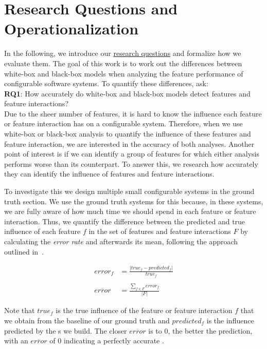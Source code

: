 \section{Research Questions and Operationalization}\label{ch:operationalization}

In the following, we introduce our \hyperref[researchQuestions]{research questions} and formalize how we evaluate them. 
The goal of this work is to work out the differences between white-box and black-box models when analyzing the feature performance of configurable
software systems. 
To quantify these differences, ask:\\

\noindent \textbf{RQ1}: How accurately do white-box and black-box models detect features and feature interactions? \\

Due to the sheer number of features, it is hard to know the influence each feature or feature interaction has on a configurable system. 
Therefore, when we use white-box or black-box analysis to quantify the influence of these features and feature interaction, 
we are interested in the accuracy of both analyses. 
Another point of interest is if we can identify a group of features for which either analysis performs worse than its counterpart.
To answer this, we research how accurately they can identify the influence of features and feature interactions.

To investigate this we design multiple small configurable systems in the ground truth section. 
We use the ground truth systems for this because, in these systems, 
we are fully aware of how much time we should spend in each feature or feature interaction. 
Thus, we quantify the difference between the predicted and true influence of each feature $f$ in the set of features and feature interactions $F$
by calculating the \emph{error rate} and afterwards its mean, following the approach outlined in~\cite{mape}. %


\begin{align}
    error_f &= \frac{\lvert true_f - predicted_f \rvert}{true_f} \label{equ:APE_RQ1} \\ \nonumber \\
    \overline{error}  &= \frac{\sum_{f \in F} error_f}{\lvert F \rvert} \label{equ:MAPE_RQ1}
\end{align}

Note that $true_f$ is the true influence of the feature or feature interaction $f$ that we obtain from the baseline of our ground truth 
and $predicted_f$ is the influence predicted by the {\perfInfluenceModel}s we build.
The closer $\overline{error}$ is to $0$, the better the prediction, with an $\overline{error}$ of 0 indicating a perfectly
accurate \perfInfluenceModel. 

